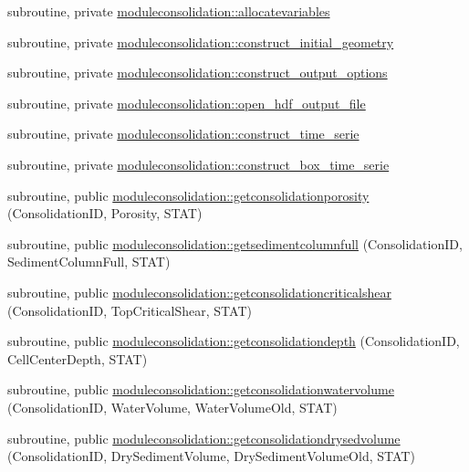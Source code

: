 \begin{DoxyCompactItemize}
\item 
subroutine, private \mbox{\hyperlink{namespacemoduleconsolidation_a8bde788846d06954ea13eb84223da96a}{moduleconsolidation\+::allocatevariables}}
\item 
subroutine, private \mbox{\hyperlink{namespacemoduleconsolidation_aefbb1dd3cecd84ab6814af87893b00d1}{moduleconsolidation\+::construct\+\_\+initial\+\_\+geometry}}
\item 
subroutine, private \mbox{\hyperlink{namespacemoduleconsolidation_a29241b472f688e15c435e72ca5da5273}{moduleconsolidation\+::construct\+\_\+output\+\_\+options}}
\item 
subroutine, private \mbox{\hyperlink{namespacemoduleconsolidation_a815002368bde1f9440c793d1c3f03f37}{moduleconsolidation\+::open\+\_\+hdf\+\_\+output\+\_\+file}}
\item 
subroutine, private \mbox{\hyperlink{namespacemoduleconsolidation_a7138aa2bb0b64953d0ca37c18692d505}{moduleconsolidation\+::construct\+\_\+time\+\_\+serie}}
\item 
subroutine, private \mbox{\hyperlink{namespacemoduleconsolidation_a37594ccd5d2f08cccc42657f65ec2387}{moduleconsolidation\+::construct\+\_\+box\+\_\+time\+\_\+serie}}
\item 
subroutine, public \mbox{\hyperlink{namespacemoduleconsolidation_a47de60bcd271300a187a9ce6257be08e}{moduleconsolidation\+::getconsolidationporosity}} (Consolidation\+ID, Porosity, S\+T\+AT)
\item 
subroutine, public \mbox{\hyperlink{namespacemoduleconsolidation_ae9552437552ade51a4c1aefcb033a0e7}{moduleconsolidation\+::getsedimentcolumnfull}} (Consolidation\+ID, Sediment\+Column\+Full, S\+T\+AT)
\item 
subroutine, public \mbox{\hyperlink{namespacemoduleconsolidation_a9ca5460ab4ca639ac19eb7de5aea9bf6}{moduleconsolidation\+::getconsolidationcriticalshear}} (Consolidation\+ID, Top\+Critical\+Shear, S\+T\+AT)
\item 
subroutine, public \mbox{\hyperlink{namespacemoduleconsolidation_a7d4c44834bf2eef5548235e522170c91}{moduleconsolidation\+::getconsolidationdepth}} (Consolidation\+ID, Cell\+Center\+Depth, S\+T\+AT)
\item 
subroutine, public \mbox{\hyperlink{namespacemoduleconsolidation_a26b0c6595143115c8e9db2d46e42ba05}{moduleconsolidation\+::getconsolidationwatervolume}} (Consolidation\+ID, Water\+Volume, Water\+Volume\+Old, S\+T\+AT)
\item 
subroutine, public \mbox{\hyperlink{namespacemoduleconsolidation_a34d40947baf053926b3fe4e02b7c1225}{moduleconsolidation\+::getconsolidationdrysedvolume}} (Consolidation\+ID, Dry\+Sediment\+Volume, Dry\+Sediment\+Volume\+Old, S\+T\+AT)

\end{DoxyCompactItemize}
